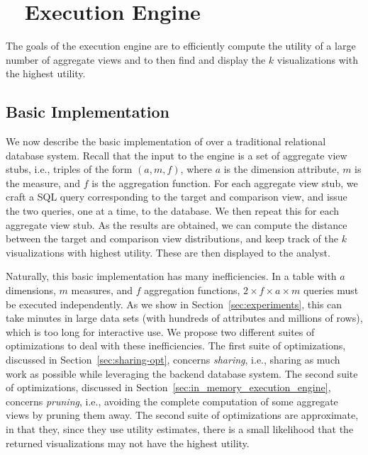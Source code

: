 \section{{\large \SeeDB\ } Execution Engine}
The goals of the \SeeDB execution engine are to efficiently
compute the utility of a large number of aggregate views
and to then find and display the $k$ visualizations with the highest utility.

\subsection{Basic Implementation} \label{sec:dbms-exec-engine}

We now describe the basic implementation of \SeeDB
over a traditional relational database system.
Recall that the input to the \SeeDB engine is a set of 
aggregate view stubs, i.e., triples of the form
$(a, m, f)$, where $a$ is the dimension attribute, $m$ is the measure,
and $f$ is the aggregation function.
For each aggregate view stub, we craft
a SQL query corresponding to the target
and comparison view, and issue
the two queries, one at a time, to the database.
We then repeat this for each aggregate view stub.
As the results are obtained, we can compute the
distance between the target and comparison view
distributions, and keep track of the $k$ visualizations
with highest utility. These are then displayed
to the analyst.


Naturally, this basic implementation has many inefficiencies.
In a table with $a$ dimensions, $m$ measures, and $f$ aggregation functions, 
$2\times f \times a \times  m$ queries must be executed independently.  
As we show in Section~\ref{sec:experiments}, this can take minutes in
large data sets (with hundreds of attributes and millions of rows), which is too long for interactive use. 
We propose two different suites of optimizations to deal with these
inefficiencies.
The first suite of optimizations, discussed in Section~\ref{sec:sharing-opt}, concerns {\em sharing}, 
i.e., sharing as much work as possible while leveraging the 
backend database system.
The second suite of optimizations, discussed in Section~\ref{sec:in_memory_execution_engine}, concerns {\em pruning},
i.e., avoiding the complete computation of some aggregate views
by pruning them away. The second suite of optimizations
are approximate, in that they, since they use utility estimates, there is a small likelihood that the returned visualizations may not have the highest utility.

